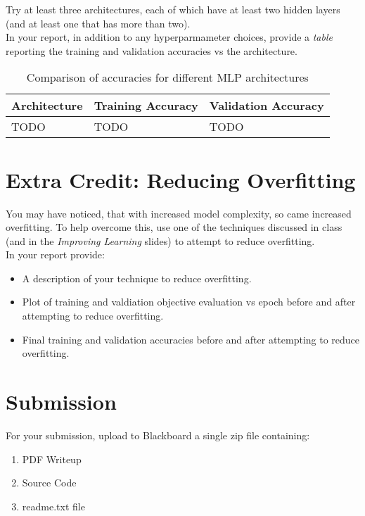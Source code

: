 \documentclass[12pt]{article}
\begin{document}
\noindent
Try at least three architectures, each of which have at least two hidden layers (and at least one that has more than two).\\

\noindent
In your report, in addition to any hyperparmameter choices,  provide a \emph{table} reporting the training and validation accuracies vs the architecture.

\begin{table}[h]
\begin{center}
\begin{tabular}{|l|l|l|}
\hline
Architecture & Training Accuracy & Validation Accuracy\\
\hline
\hline
TODO & TODO & TODO\\
\hline
\end{tabular}
\caption{Comparison of accuracies for different MLP architectures}
\end{center}
\end{table}

\section{Extra Credit: Reducing Overfitting}
You may have noticed, that with increased model complexity, so came increased overfitting.  To help overcome this, use one of the techniques discussed in class (and in the \emph{Improving Learning} slides) to attempt to reduce overfitting.\\

\noindent
In your report provide:
\begin{itemize}
\item A description of your technique to reduce overfitting.
\item Plot of training and valdiation objective evaluation vs epoch before and after attempting to reduce overfitting.
\item Final training and validation accuracies before and after attempting to reduce overfitting.
\end{itemize}
\newpage
\section*{Submission}
For your submission, upload to Blackboard a single zip file containing:

\begin{enumerate}
\item PDF Writeup
\item Source Code
\item readme.txt file
\end{enumerate}
\end{document}
